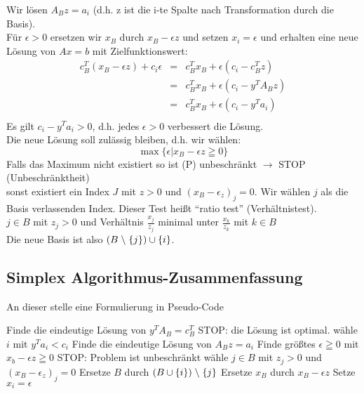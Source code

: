 Wir lösen $A_{B}z = a_{i}$ (d.h. z ist die i-te Spalte nach
Transformation durch die Basis).\\
Für $\epsilon > 0$ ersetzen wir $x_{B}$ durch $x_{B} - \epsilon z$ und
setzen $x_{i} = \epsilon$ und erhalten eine neue Lösung von $A x=b$ mit
Zielfunktionswert:\\
\[\begin{array}{rcl}
c_{B}^{T} (x_{B} - \epsilon z) + c_{i} \epsilon &=& c_{B}^{T} x_{B} +
\epsilon (c_{i} -c_{B}^{T} z)\\
&=&c_{B}^{T} x_{B} + \epsilon (c_{i} -y^{T}A_{B} z)\\
&=&c_{B}^{T} x_{B} + \epsilon (c_{i} -y^{T} a_{i})\\
\end{array}\] 
Es gilt $c_{i} - y^{T} a_{i} > 0$, d.h. jedes $\epsilon > 0$ verbessert die
Lösung.\\
Die neue Lösung soll zulässig bleiben, d.h. wir wählen:
\[ \max \{\epsilon | x_{B} -\epsilon {z} \geqq 0 \}\]
Falls das Maximum nicht existiert so ist (P) unbeschränkt $\rightarrow$
STOP (Unbeschränktheit)\\
sonst existiert ein Index $J$ mit $z > 0$ und $(x_{B} - \epsilon_{z})_{j}
=0$. Wir wählen $j$ als die Basis verlassenden Index. Dieser Test heißt
"`ratio test"' (Verhältnistest).\\
$j\in B$ mit $z_{j} > 0$ und Verhältnis $\frac{x_{j}}{z_{j}}$ minimal unter
$\frac{x_{k}}{z_{k}}$ mit $k \in B$\\
Die neue Basis ist also $(B \;\backslash\; \{j\}) \cup \{i\}$.

\subsection{Simplex Algorithmus-Zusammenfassung}

An dieser stelle eine Formulierung in Pseudo-Code

\begin{algorithmic}
\LOOP
\STATE Finde die eindeutige Lösung von $y^{T}A_{B} = c_{B}^{T}$
\STATE STOP: die Lösung ist optimal.
\ELSE 
\STATE wähle $i$ mit $y^{T}a_{i} < c_{i}$
\STATE Finde die eindeutige Lösung von $A_{B}z=a_{i}$
\STATE Finde größtes $\epsilon \geqq 0$ mit $ x_{b} - \epsilon z \geqq 0$
\IF{ $\nexists \epsilon$ }
\STATE STOP: Problem ist unbeschränkt
\ELSE
\STATE wähle $j \in B$ mit $z_{j} > 0$ und $(x_{B} - \epsilon_{z})_{j}
= 0$
\STATE Ersetze $B$ durch $(B \cup \{i\}) \;\backslash\; \{j\}$
\STATE Ersetze $x_{B}$ durch $x_{B} - \epsilon z$
\STATE  Setze $x_{i} = \epsilon$ 
\ENDIF
\ENDIF
\ENDLOOP
\end{algorithmic}

